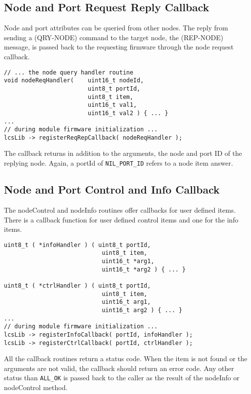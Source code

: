 \subsection{Node and Port Request Reply Callback}

Node and port attributes can be queried from other nodes. The reply from sending a (QRY-NODE) command to the target node, the (REP-NODE) message, is passed back to the requesting firmware through the node request callback.

\lstset{style=codesnippetstyle}
\begin{lstlisting}
// ... the node query handler routine
void nodeReqHandler(    uint16_t nodeId, 
                        uint8_t portId, 
                        uint8_t item, 
                        uint16_t val1, 
                        uint16_t val2 ) { ... }
...
// during module firmware initialization ...
lcsLib -> registerReqRepCallback( nodeReqHandler );
\end{lstlisting}

The callback returns in addition to the arguments, the node and port ID of the replying node. Again, a portId of \texttt{NIL\_PORT\_ID} refers to a node item answer.

\subsection{Node and Port Control and Info Callback}

The nodeControl and nodeInfo routines offer callbacks for user defined items. There is a callback function for user defined control items and one for the info items.

\lstset{style=codesnippetstyle}
\begin{lstlisting}
uint8_t ( *infoHandler ) ( uint8_t portId, 
                            uint8_t item, 
                            uint16_t *arg1, 
                            uint16_t *arg2 ) { ... }

uint8_t ( *ctrlHandler ) ( uint8_t portId, 
                            uint8_t item, 
                            uint16_t arg1, 
                            uint16_t arg2 ) { ... }
...
// during module firmware initialization ...
lcsLib -> registerInfoCallback( portId, infoHandler );
lcsLib -> registerCtrlCallback( portId, ctrlHandler );
\end{lstlisting}

All the callback routines return a status code. When the item is not found or the arguments are not valid, the callback should return an error code. Any other status than \texttt{ALL\_OK} is passed back to the caller as the result of the nodeInfo or nodeControl method.

